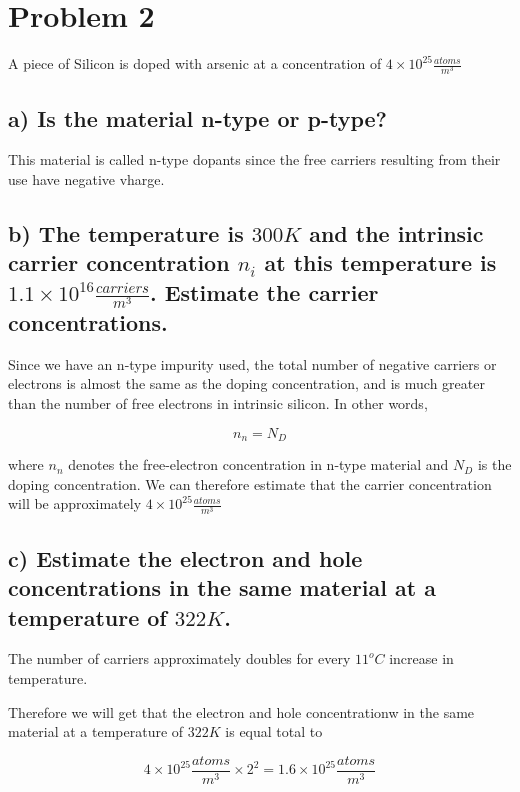 \section{Problem 2}
A piece of Silicon is doped with arsenic at a concentration of $4 \times 10^25 \frac{atoms}{m^3}$

\subsection*{a) Is the material n-type or p-type?}

This material is called n-type dopants since the free carriers resulting from their use have negative vharge.

\subsection*{b) The temperature is $300 K$ and the intrinsic carrier concentration $n_i$ at this temperature is $1.1 \times 10^16 \frac{carriers}{m^3}$. Estimate the carrier concentrations.}

Since we have an n-type impurity used, the total number of negative carriers or electrons is almost the same as the doping concentration, and is much greater than the number of free electrons in intrinsic silicon. In other words,

\begin{equation*}
    n_n = N_D
\end{equation*}

where $n_n$ denotes the free-electron concentration in n-type material and $N_D$ is the doping concentration. We can therefore estimate that the carrier concentration will be approximately $4 \times 10^{25} \frac{atoms}{m^3}$

\subsection*{c) Estimate the electron and hole concentrations in the same material at a temperature
of $322 K$.}

The number of carriers approximately doubles for every $11 ^o C$ increase in temperature.

Therefore we will get that the electron and hole concentrationw in the same material at a temperature of $322 K$ is equal total to 

\begin{equation*}
    4 \times 10^{25} \frac{atoms}{m^3} \times 2^2 = 1.6 \times 10^ {25}\frac{atoms}{m^3}
\end{equation*}

